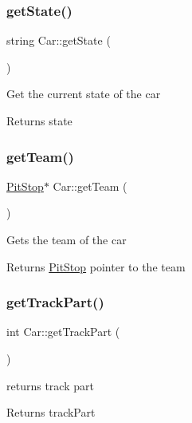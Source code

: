 \subsubsection{\texorpdfstring{get\+State()}{getState()}}
{\footnotesize\ttfamily string Car\+::get\+State (\begin{DoxyParamCaption}{ }\end{DoxyParamCaption})}

Get the current state of the car \begin{DoxyReturn}{Returns}
state 
\end{DoxyReturn}
\mbox{\label{class_car_a597150e71ff1eb914f82eee7e545cddf}} 
\subsubsection{\texorpdfstring{get\+Team()}{getTeam()}}
{\footnotesize\ttfamily \mbox{\hyperlink{class_pit_stop}{Pit\+Stop}}$\ast$ Car\+::get\+Team (\begin{DoxyParamCaption}{ }\end{DoxyParamCaption})\hspace{0.3cm}{\ttfamily [inline]}}

Gets the team of the car \begin{DoxyReturn}{Returns}
\mbox{\hyperlink{class_pit_stop}{Pit\+Stop}} pointer to the team 
\end{DoxyReturn}
\mbox{\label{class_car_abecf0c28ecabc7f74bd40a3504da3a3a}} 
\subsubsection{\texorpdfstring{get\+Track\+Part()}{getTrackPart()}}
{\footnotesize\ttfamily int Car\+::get\+Track\+Part (\begin{DoxyParamCaption}{ }\end{DoxyParamCaption})\hspace{0.3cm}{\ttfamily [inline]}}

returns track part \begin{DoxyReturn}{Returns}
track\+Part 
\end{DoxyReturn}
\mbox{\label{class_car_a63dd14b9889f022373971846b088f65f}} 
